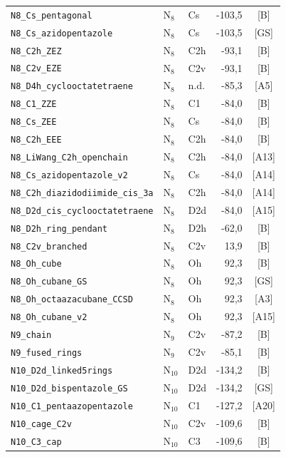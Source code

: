 \begin{longtable}{@{}p{4.6cm}lp{1.4cm}rc@{}}
\texttt{N8\_Cs\_pentagonal} & N$_{8}$ & Cs & -103{,}5 & [B] \\
\texttt{N8\_Cs\_azidopentazole} & N$_{8}$ & Cs & -103{,}5 & [GS] \\
\texttt{N8\_C2h\_ZEZ} & N$_{8}$ & C2h & -93{,}1 & [B] \\
\texttt{N8\_C2v\_EZE} & N$_{8}$ & C2v & -93{,}1 & [B] \\
\texttt{N8\_D4h\_cyclooctatetraene} & N$_{8}$ & n.d. & -85{,}3 & [A5] \\
\texttt{N8\_C1\_ZZE} & N$_{8}$ & C1 & -84{,}0 & [B] \\
\texttt{N8\_Cs\_ZEE} & N$_{8}$ & Cs & -84{,}0 & [B] \\
\texttt{N8\_C2h\_EEE} & N$_{8}$ & C2h & -84{,}0 & [B] \\
\texttt{N8\_LiWang\_C2h\_openchain} & N$_{8}$ & C2h & -84{,}0 & [A13] \\
\texttt{N8\_Cs\_azidopentazole\_v2} & N$_{8}$ & Cs & -84{,}0 & [A14] \\
\texttt{N8\_C2h\_diazidodiimide\_cis\_3a} & N$_{8}$ & C2h & -84{,}0 & [A14] \\
\texttt{N8\_D2d\_cis\_cyclooctatetraene} & N$_{8}$ & D2d & -84{,}0 & [A15] \\
\texttt{N8\_D2h\_ring\_pendant} & N$_{8}$ & D2h & -62{,}0 & [B] \\
\texttt{N8\_C2v\_branched} & N$_{8}$ & C2v & 13{,}9 & [B] \\
\texttt{N8\_Oh\_cube} & N$_{8}$ & Oh & 92{,}3 & [B] \\
\texttt{N8\_Oh\_cubane\_GS} & N$_{8}$ & Oh & 92{,}3 & [GS] \\
\texttt{N8\_Oh\_octaazacubane\_CCSD} & N$_{8}$ & Oh & 92{,}3 & [A3] \\
\texttt{N8\_Oh\_cubane\_v2} & N$_{8}$ & Oh & 92{,}3 & [A15] \\
\addlinespace
\texttt{N9\_chain} & N$_{9}$ & C2v & -87{,}2 & [B] \\
\texttt{N9\_fused\_rings} & N$_{9}$ & C2v & -85{,}1 & [B] \\
\addlinespace
\texttt{N10\_D2d\_linked5rings} & N$_{10}$ & D2d & -134{,}2 & [B] \\
\texttt{N10\_D2d\_bispentazole\_GS} & N$_{10}$ & D2d & -134{,}2 & [GS] \\
\texttt{N10\_C1\_pentaazopentazole} & N$_{10}$ & C1 & -127{,}2 & [A20] \\
\texttt{N10\_cage\_C2v} & N$_{10}$ & C2v & -109{,}6 & [B] \\
\texttt{N10\_C3\_cap} & N$_{10}$ & C3 & -109{,}6 & [B] \\

\end{longtable}
